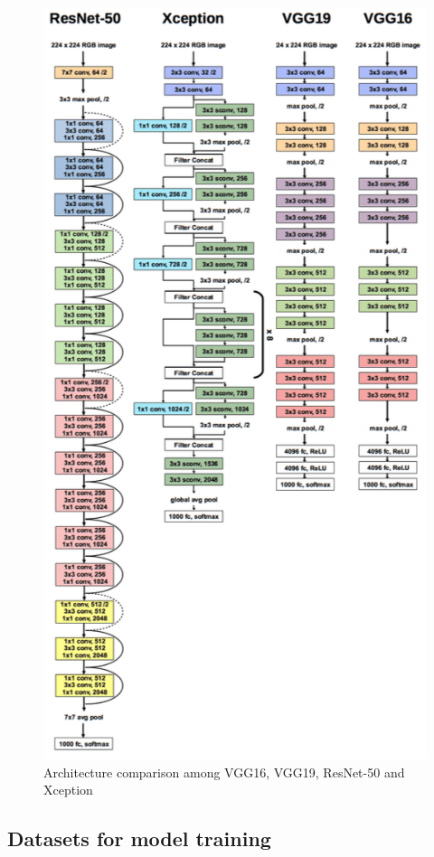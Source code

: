 \documentclass[DIV=calc, paper=a4, fontsize=10pt, twocolumn]{article}
\begin{document}
	\begin{figure}[t]
		\centering
		\includegraphics[width=0.9\linewidth]{./imgs/architecture}
		\caption{Architecture comparison among VGG16, VGG19, ResNet-50 and Xception}
		\label{fig:architecture}
	\end{figure}
	
	\subsection{Datasets for model training}
	
\end{document}

